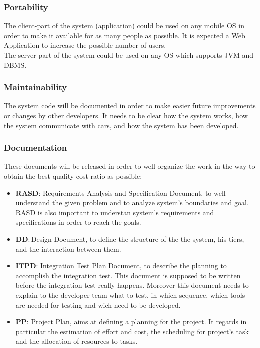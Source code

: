 \subsubsection{Portability}

The client-part of the system (application) could be used on any mobile
OS in order to make it available for as many people as possible. It
is expected a Web Application to increase the possible number of users.\\
The server-part of the system could be used on any OS which supports
JVM and DBMS.

\subsubsection{Maintainability}

The system code will be documented in order to make easier future
improvements or changes by other developers. It needs to be clear
how the system works, how the system communicate with cars, and how
the system has been developed.

\subsubsection{Documentation}

These documents will be released in order to well-organize the work
in the way to obtain the best quality-cost ratio as possible:
\begin{itemize}
\item $\boldsymbol{RASD}$: Requirements Analysis and Specification Document,
to well-understand the given problem and to analyze system's boundaries
and goal. RASD is also important to understan system's requirements
and specifications in order to reach the goals.
\item $\mathbf{\boldsymbol{DD}}:$Design Document, to define the structure
of the the system, his tiers, and the interaction between them.
\item $\boldsymbol{ITPD}$: Integration Test Plan Document, to describe
the planning to accomplish the integration test. This document is
supposed to be written before the integration test really happens.
Moreover this document needs to explain to the developer team what
to test, in which sequence, which tools are needed for testing and
wich need to be developed.
\item $\boldsymbol{PP}$: Project Plan, aims at defining a planning for
the project. It regards in particular the estimation of effort and
cost, the scheduling for project's task and the allocation of resources
to tasks. 
\end{itemize}

